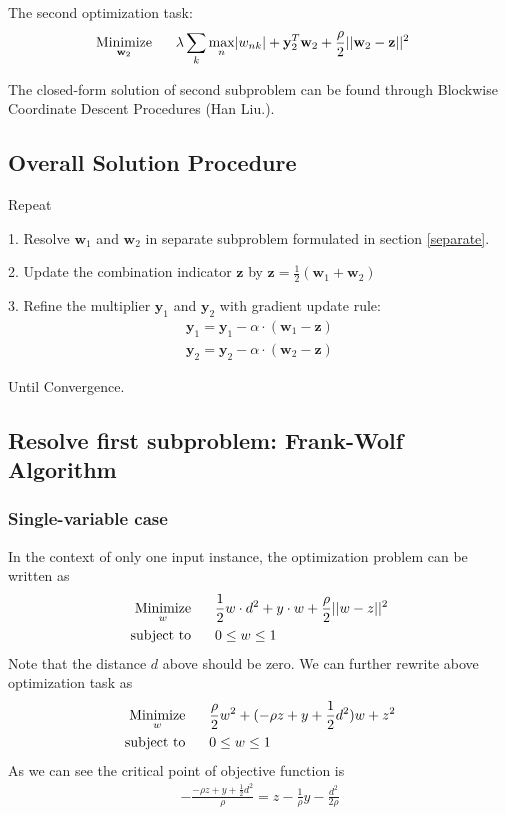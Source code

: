 \documentclass{article} %
\newcommand{\LTwoNorm}[1]{||#1||^{2}}
\newcommand{\sumk}{\sum_{k}}
\newcommand{\wnk}{w_{nk}}
\newcommand{\wone}{\mathbf{w}_1}
\newcommand{\wtwo}{\mathbf{w}_2}
\newcommand{\w}{\mathbf{w}}
\newcommand{\maxn}{ \underset{n}{\text{max}} }
\newcommand{\yone}{\mathbf{y}_1}
\newcommand{\ytwo}{\mathbf{y}_2}
\newcommand{\z}{\mathbf{z}}
\newcommand{\quadraterm}[1]{\frac{\rho}{2}\LTwoNorm{\w_{#1}-\z}}
\newcommand{\minimize}[1]{ \underset{#1}{\text{Minimize}} }
\newcommand{\subjectto}{ \text{subject to} }
\newcommand{\hs}{\hspace*{0.6cm}}
\begin{document}
 The second optimization task:
 \begin{align} \label{second}
   \minimize{\wtwo}
   \hs & \lambda \sumk \maxn | \wnk |  %
   + \mutw{2} + \quadraterm{2} 
 \end{align}

 The closed-form solution of second subproblem can be found through Blockwise
 Coordinate Descent Procedures (Han Liu.). 

\subsection{Overall Solution Procedure}
Repeat

1. Resolve $\wone$ and $\wtwo$ in separate subproblem formulated in section
\ref{separate}.

2. Update the combination indicator $\z$ by $\z = \frac{1}{2} (\wone + \wtwo)$

3. Refine the multiplier $\yone$ and $\ytwo$ with gradient update rule: 
\begin{align}
\yone = \yone - \alpha \cdot (\wone - \z) \\
\ytwo = \ytwo - \alpha \cdot (\wtwo - \z)
\end{align}

Until Convergence.

\subsection{Resolve first subproblem: Frank-Wolf Algorithm} 
\subsubsection{Single-variable case}
In the context of only one input instance, the optimization problem can be written as
\begin{align}
   \minimize{w}
   \hs & \frac{1}{2} w \cdot d^2 + y \cdot w +   %
   \frac{\rho}{2} ||w - z||^2 \\
   \subjectto
   \hs & 0 \leq  w \leq 1
\end{align}
Note that the distance $d$ above should be zero. We can further rewrite above
optimization task as 
\begin{align}
   \minimize{w}
   \hs & \frac{\rho}{2} w^2 + (- \rho  z + y + \frac{1}{2} d^2) w + z^2 \\
   \subjectto
   \hs & 0 \leq  w \leq 1
\end{align}
As we can see the critical point of objective function is 
\begin{align}
    -\frac{- \rho  z + y + \frac{1}{2}d^2}{\rho} 
    = z - \frac{1}{\rho} y - \frac{d^2}{2\rho}
\end{align}
\end{document}
